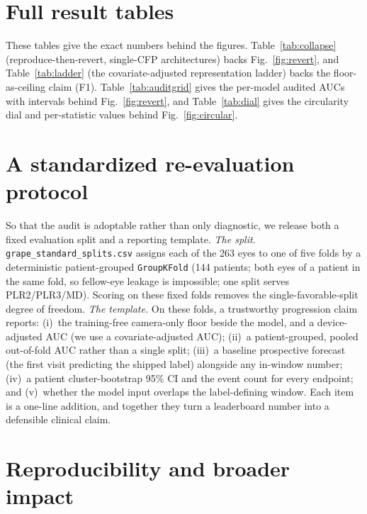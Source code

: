 \section{Full result tables}
\label{app:fulltables}

These tables give the exact numbers behind the figures. Table~\ref{tab:collapse} (reproduce-then-revert, single-CFP
architectures) backs Fig.~\ref{fig:revert}, and Table~\ref{tab:ladder} (the covariate-adjusted representation ladder)
backs the floor-as-ceiling claim (F1). Table~\ref{tab:auditgrid} gives the per-model audited AUCs with intervals
behind Fig.~\ref{fig:revert}, and Table~\ref{tab:dial} gives the circularity dial and per-statistic values behind
Fig.~\ref{fig:circular}.



\section{A standardized re-evaluation protocol}
\label{app:template}

So that the audit is adoptable rather than only diagnostic, we release both a fixed evaluation split and a reporting
template. \emph{The split.} \texttt{grape\_standard\_splits.csv} assigns each of the 263 eyes to one of five folds by a
deterministic patient-grouped \texttt{GroupKFold} (\num{144} patients; both eyes of a patient in the same fold, so
fellow-eye leakage is impossible; one split serves PLR2/PLR3/MD). Scoring on these fixed folds removes the
single-favorable-split degree of freedom. \emph{The template.} On these folds, a trustworthy progression claim reports:
(i)~the training-free camera-only floor beside the model, and a device-adjusted AUC (we use a covariate-adjusted AUC);
(ii)~a patient-grouped, pooled out-of-fold AUC rather than a single split; (iii)~a baseline prospective forecast (the
first visit predicting the shipped label) alongside any in-window number; (iv)~a patient cluster-bootstrap \num{95}\% CI
and the event count for every endpoint; and (v)~whether the model input overlaps the label-defining window. Each item is
a one-line addition, and together they turn a leaderboard number into a defensible clinical claim.

\section{Reproducibility and broader impact}
\label{app:repro}

